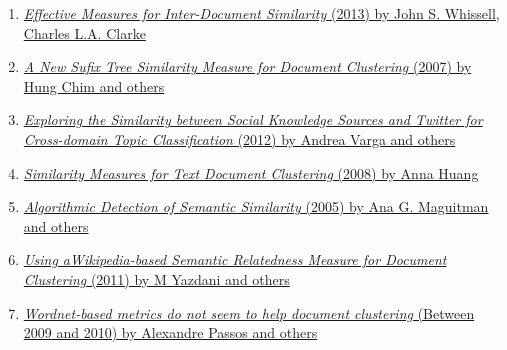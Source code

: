 \documentclass[12pt]{article}
\begin{document}
\begin{framed}
\begin{enumerate}
\item \href{https://github.com/nmonath/NLPProject/blob/master/research/papers/p1361-whissell.pdf}{\emph{Effective Measures for Inter-Document Similarity} (2013) by John S. Whissell, Charles L.A. Clarke}

\item \href{https://github.com/nmonath/NLPProject/blob/master/research/papers/paper091.pdf}{\emph{A New Sufix Tree Similarity Measure for Document
Clustering} (2007) by Hung Chim and others}

\item \href{https://github.com/nmonath/NLPProject/blob/master/research/papers/paper8.pdf}{\emph{Exploring the Similarity between Social Knowledge
Sources and Twitter for Cross-domain Topic
Classification} (2012) by Andrea Varga and others}

\item \href{https://github.com/nmonath/NLPProject/blob/master/research/papers/pg049_Similarity_Measures_for_Text_Document_Clustering.pdf}{\emph{Similarity Measures for Text Document Clustering} (2008) by Anna Huang}

\item \href{https://github.com/nmonath/NLPProject/blob/master/research/papers/semsim.pdf}{\emph{Algorithmic Detection of Semantic Similarity} (2005) by Ana G. Maguitman and others}

\item \href{https://github.com/nmonath/NLPProject/blob/master/research/papers/textgraph.pdf}{\emph{Using aWikipedia-based Semantic Relatedness Measure for Document
Clustering} (2011) by M Yazdani and others}

\item \href{https://github.com/nmonath/NLPProject/blob/master/research/papers/wncluster.pdf}{\emph{Wordnet-based metrics do not seem to help
document clustering} (Between 2009 and 2010) by Alexandre Passos and others}







\end{enumerate}
\end{framed}

\clearpage
\end{document}
